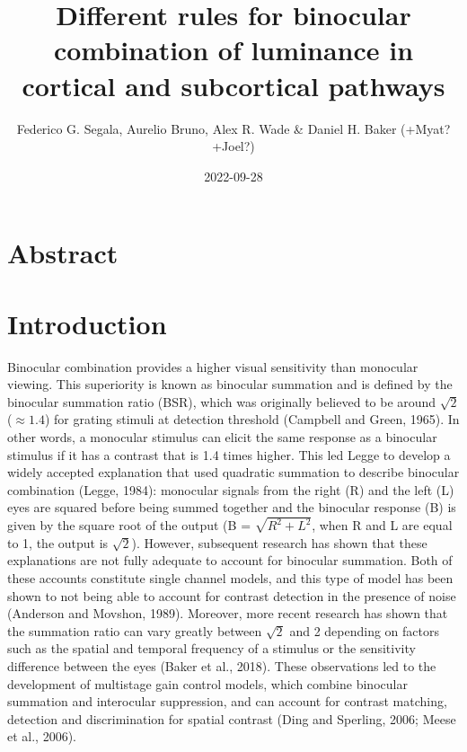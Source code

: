 \documentclass[
]{article}
\title{Different rules for binocular combination of luminance in cortical and subcortical pathways}
\author{Federico G. Segala, Aurelio Bruno, Alex R. Wade \& Daniel H. Baker (+Myat? +Joel?)}
\date{2022-09-28}
\begin{document}
\maketitle

\hypertarget{abstract}{%
\section{Abstract}\label{abstract}}

\hypertarget{introduction}{%
\section{Introduction}\label{introduction}}

Binocular combination provides a higher visual sensitivity than monocular viewing. This superiority is known as binocular summation and is defined by the binocular summation ratio (BSR), which was originally believed to be around \(\sqrt{2}\) (\(\approx1.4\)) for grating stimuli at detection threshold (Campbell and Green, 1965). In other words, a monocular stimulus can elicit the same response as a binocular stimulus if it has a contrast that is 1.4 times higher. This led Legge to develop a widely accepted explanation that used quadratic summation to describe binocular combination (Legge, 1984): monocular signals from the right (R) and the left (L) eyes are squared before being summed together and the binocular response (B) is given by the square root of the output (B = \(\sqrt{R^2 + L^2}\), when R and L are equal to 1, the output is \(\sqrt{2}\)). However, subsequent research has shown that these explanations are not fully adequate to account for binocular summation. Both of these accounts constitute single channel models, and this type of model has been shown to not being able to account for contrast detection in the presence of noise (Anderson and Movshon, 1989). Moreover, more recent research has shown that the summation ratio can vary greatly between \(\sqrt{2}\) and 2 depending on factors such as the spatial and temporal frequency of a stimulus or the sensitivity difference between the eyes (Baker et al., 2018). These observations led to the development of multistage gain control models, which combine binocular summation and interocular suppression, and can account for contrast matching, detection and discrimination for spatial contrast (Ding and Sperling, 2006; Meese et al., 2006).
\end{document}
